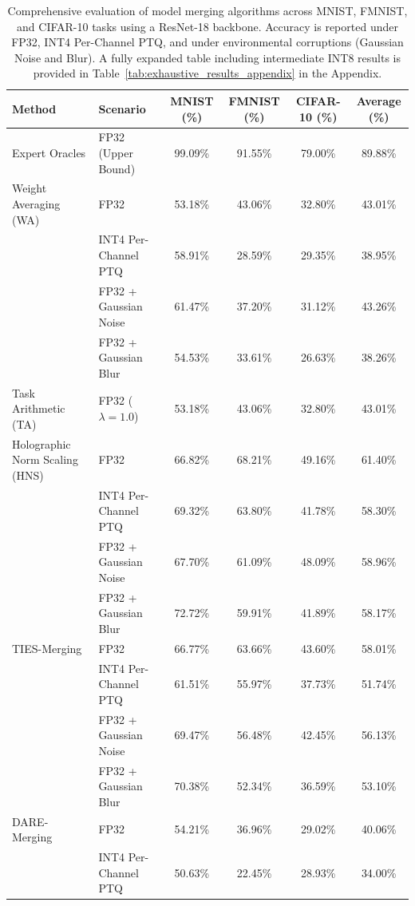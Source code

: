 \documentclass{article}
\theoremstyle{plain}
\theoremstyle{definition}
\theoremstyle{remark}
\begin{document}
\begin{table}[t]
\caption{Comprehensive evaluation of model merging algorithms across MNIST, FMNIST, and CIFAR-10 tasks using a ResNet-18 backbone. Accuracy is reported under FP32, INT4 Per-Channel PTQ, and under environmental corruptions (Gaussian Noise and Blur). A fully expanded table including intermediate INT8 results is provided in Table~\ref{tab:exhaustive_results_appendix} in the Appendix.}
\label{tab:main_results}
\vskip 0.15in
\begin{center}
\begin{small}
\setlength{\tabcolsep}{3.5pt}
\begin{tabular}{llcccc}
\toprule
Method & Scenario & MNIST (\%) & FMNIST (\%) & CIFAR-10 (\%) & Average (\%) \\
\midrule
Expert Oracles & FP32 (Upper Bound) & 99.09\% & 91.55\% & 79.00\% & 89.88\% \\
\midrule
Weight Averaging (WA) & FP32 & 53.18\% & 43.06\% & 32.80\% & 43.01\% \\
& INT4 Per-Channel PTQ & 58.91\% & 28.59\% & 29.35\% & 38.95\% \\
& FP32 + Gaussian Noise & 61.47\% & 37.20\% & 31.12\% & 43.26\% \\
& FP32 + Gaussian Blur & 54.53\% & 33.61\% & 26.63\% & 38.26\% \\
\midrule
Task Arithmetic (TA) & FP32 ($\lambda = 1.0$) & 53.18\% & 43.06\% & 32.80\% & 43.01\% \\
\midrule
Holographic Norm Scaling (HNS) & FP32 & 66.82\% & 68.21\% & 49.16\% & 61.40\% \\
& INT4 Per-Channel PTQ & 69.32\% & 63.80\% & 41.78\% & 58.30\% \\
& FP32 + Gaussian Noise & 67.70\% & 61.09\% & 48.09\% & 58.96\% \\
& FP32 + Gaussian Blur & 72.72\% & 59.91\% & 41.89\% & 58.17\% \\
\midrule
TIES-Merging & FP32 & 66.77\% & 63.66\% & 43.60\% & 58.01\% \\
& INT4 Per-Channel PTQ & 61.51\% & 55.97\% & 37.73\% & 51.74\% \\
& FP32 + Gaussian Noise & 69.47\% & 56.48\% & 42.45\% & 56.13\% \\
& FP32 + Gaussian Blur & 70.38\% & 52.34\% & 36.59\% & 53.10\% \\
\midrule
DARE-Merging & FP32 & 54.21\% & 36.96\% & 29.02\% & 40.06\% \\
& INT4 Per-Channel PTQ & 50.63\% & 22.45\% & 28.93\% & 34.00\% \\

\end{tabular}
\end{small}
\end{center}
\end{table}
\end{document}
